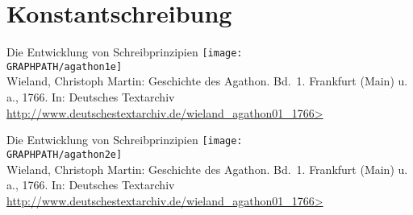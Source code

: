 \section[Konstanz]{Konstantschreibung}

\begin{frame}
  {Die Entwicklung von Schreibprinzipien}
  \pause
  \centering
  \texttt{[image: \\GRAPHPATH/agathon1e]}\\[0.5\baselineskip]
  {\tiny Wieland, Christoph Martin: Geschichte des Agathon. Bd.\ 1. Frankfurt (Main) u.\,a., 1766. In: Deutsches Textarchiv\\[-1\baselineskip]
    \url{http://www.deutschestextarchiv.de/wieland_agathon01_1766>}}
\end{frame}

\begin{frame}
  {Die Entwicklung von Schreibprinzipien}
  \centering
  \texttt{[image: \\GRAPHPATH/agathon2e]}\\[0.5\baselineskip]
  {\tiny Wieland, Christoph Martin: Geschichte des Agathon. Bd.\ 1. Frankfurt (Main) u.\,a., 1766. In: Deutsches Textarchiv\\[-1\baselineskip]
    \url{http://www.deutschestextarchiv.de/wieland_agathon01_1766>}}
\end{frame}

